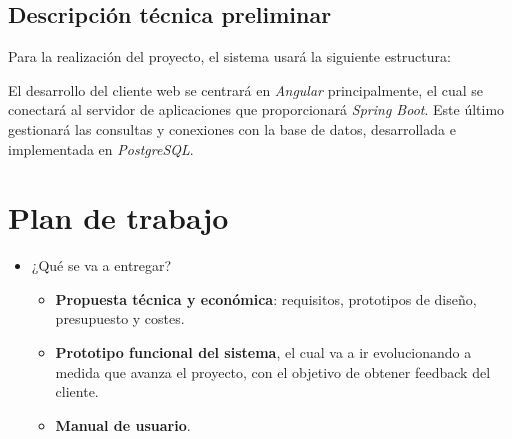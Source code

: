 \documentclass{article}
\begin{document}
\newpage
\subsection{Descripción técnica preliminar}
Para la realización del proyecto, el sistema usará la siguiente estructura: \vspace{0.15cm}

\begin{figure}[H]
\end{figure}
\vspace{0.15cm}

El desarrollo del cliente web se centrará en \textit{Angular} principalmente, el cual se conectará al servidor de aplicaciones que proporcionará \textit{Spring Boot}. Este último gestionará las consultas y conexiones con la base de datos, desarrollada e implementada en \textit{PostgreSQL}.
\newpage

\section{Plan de trabajo}
\begin{itemize}
	\item ¿Qué se va a entregar?
	\begin{itemize}
		\item \textbf{Propuesta técnica y económica}: requisitos, prototipos de diseño, presupuesto y costes.
		\item \textbf{Prototipo funcional del sistema}, el cual va a ir evolucionando a medida que avanza el proyecto, con el objetivo de obtener feedback del cliente.
		\item \textbf{Manual de usuario}.
	\end{itemize}
\end{itemize}
\end{document}

